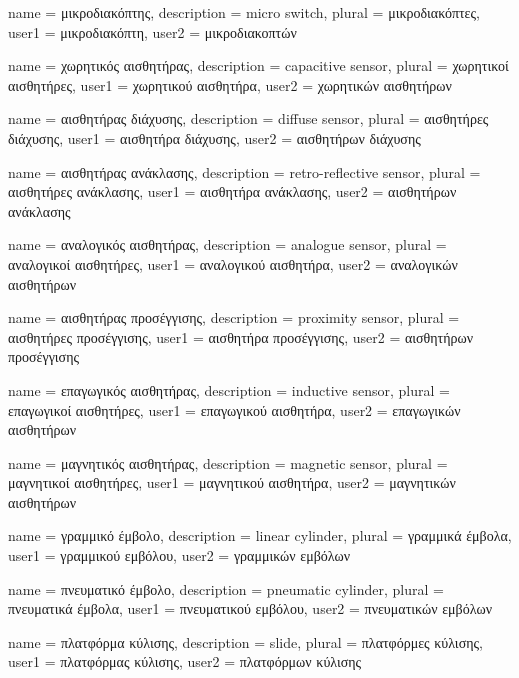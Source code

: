 	{name			= {μικροδιακόπτης},
	 description	= {micro switch},
	 plural			= {μικροδιακόπτες},
	 user1			= {μικροδιακόπτη},
	 user2			= {μικροδιακοπτών}
	}
	
	{name			= {χωρητικός αισθητήρας},
	 description	= {capacitive sensor},
	 plural			= {χωρητικοί αισθητήρες},
	 user1			= {χωρητικού αισθητήρα},
	 user2			= {χωρητικών αισθητήρων}
	}
	
	{name			= {αισθητήρας διάχυσης},
	 description	= {diffuse sensor},
	 plural			= {αισθητήρες διάχυσης},
	 user1			= {αισθητήρα διάχυσης},
	 user2			= {αισθητήρων διάχυσης}
	}
	
	{name			= {αισθητήρας ανάκλασης},
	 description	= {retro-reflective sensor},
	 plural			= {αισθητήρες ανάκλασης},
	 user1			= {αισθητήρα ανάκλασης},
	 user2			= {αισθητήρων ανάκλασης}
	}
	
	{name			= {αναλογικός αισθητήρας},
	 description	= {analogue sensor},
	 plural			= {αναλογικοί αισθητήρες},
	 user1			= {αναλογικού αισθητήρα},
	 user2			= {αναλογικών αισθητήρων}
	}
	
	{name			= {αισθητήρας προσέγγισης},
	 description	= {proximity sensor},
	 plural			= {αισθητήρες προσέγγισης},
	 user1			= {αισθητήρα προσέγγισης},
	 user2			= {αισθητήρων προσέγγισης}
	}
	
	{name			= {επαγωγικός αισθητήρας},
	 description	= {inductive sensor},
	 plural			= {επαγωγικοί αισθητήρες},
	 user1			= {επαγωγικού αισθητήρα},
	 user2			= {επαγωγικών αισθητήρων}
	}
	
	{name			= {μαγνητικός αισθητήρας},
	 description	= {magnetic sensor},
	 plural			= {μαγνητικοί αισθητήρες},
	 user1			= {μαγνητικού αισθητήρα},
	 user2			= {μαγνητικών αισθητήρων}
	}
		
	{name			= {γραμμικό έμβολο},
	 description	= {linear cylinder},
	 plural			= {γραμμικά έμβολα},
	 user1			= {γραμμικού εμβόλου},
	 user2			= {γραμμικών εμβόλων}
	}
	
	{name			= {πνευματικό έμβολο},
	 description	= {pneumatic cylinder},
	 plural			= {πνευματικά έμβολα},
	 user1			= {πνευματικού εμβόλου},
	 user2			= {πνευματικών εμβόλων}
	}
		
	{name			= {πλατφόρμα κύλισης},
	 description	= {slide},
	 plural			= {πλατφόρμες κύλισης},
	 user1			= {πλατφόρμας κύλισης},
	 user2			= {πλατφόρμων κύλισης}
	}
	
